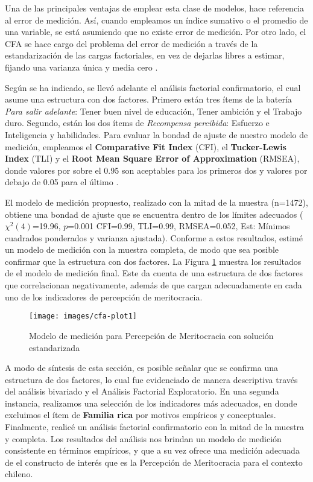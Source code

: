 \documentclass[12pt]{article}
\begin{document}
Una de las principales ventajas de emplear esta clase de modelos, hace referencia al error de medición. Así, cuando empleamos un índice sumativo o el promedio de una variable, se está asumiendo que no existe error de medición. Por otro lado, el CFA se hace cargo del problema del error de medición a través de la estandarización de las cargas factoriales, en vez de dejarlas libres a estimar, fijando una varianza única y media cero \citep{Brown2008}.

Según se ha indicado, se llevó adelante el análisis factorial confirmatorio, el cual asume una estructura con dos factores. Primero están tres ítems de la batería \textit{Para salir adelante}: Tener buen nivel de educación, Tener ambición y el Trabajo duro. Segundo, están los dos ítems de \textit{Recompensa percibida}: Esfuerzo e Inteligencia y habilidades.  Para evaluar la bondad de ajuste de nuestro modelo de medición, empleamos el \textbf{Comparative Fit Index} (CFI), el \textbf{Tucker-Lewis Index} (TLI) y el \textbf{Root Mean Square Error of Approximation} (RMSEA), donde valores por sobre el 0.95 son aceptables para los primeros dos y valores por debajo de 0.05 para el último \citep[Cap. 3 y 4]{Brown2008}. 

El modelo de medición propuesto, realizado con la mitad de la muestra (n=1472), obtiene una bondad de ajuste que se encuentra dentro de los límites adecuados ($\chi^2(4)$=19.96, $p$=0.001 CFI=0.99, TLI=0.99, RMSEA=0.052, Est: Mínimos cuadrados ponderados y varianza ajustada). Conforme a estos resultados, estimé un modelo de medición con la muestra completa, de modo que sea posible confirmar que la estructura con dos factores. La Figura \ref{fig:cfa1} muestra los resultados de el modelo de medición final. Este da cuenta de una estructura de dos factores que correlacionan negativamente, además de que cargan adecuadamente en cada uno de los indicadores de percepción de meritocracia.     

\begin{figure}[H]
\begin{center}
	\texttt{[image: images/cfa-plot1]}
	\caption[Figura 1: Modelo de medición: Percepción de Meritocracia]{Modelo de medición para Percepción de Meritocracia con solución estandarizada}
	\label{fig:cfa1}
\end{center}
\end{figure}

A modo de síntesis de esta sección, es posible señalar que se confirma una estructura de dos factores, lo cual fue evidenciado de manera descriptiva través del análisis bivariado y el Análisis Factorial Exploratorio. En una segunda instancia, realizamos una selección de los indicadores más adecuados, en donde excluimos el ítem de \textbf{Familia rica} por motivos empíricos y conceptuales. Finalmente, realicé un análisis factorial confirmatorio con la mitad de la muestra y completa. Los resultados del análisis nos brindan un modelo de medición consistente en términos empíricos, y que a su vez ofrece una medición adecuada de el constructo de interés que es la Percepción de Meritocracia para el contexto chileno. 
\end{document}
